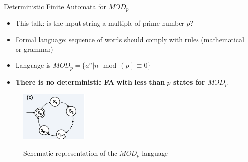 \documentclass[aspectratio=169,9pt]{beamer}
\begin{document}
\begin{frame}[t]{Deterministic Finite Automata for $MOD_p$}
  \begin{itemize}
    \item This talk: is the input string a multiple of prime number $p$?
    \item Formal language: sequence of words should comply with rules (mathematical or grammar)
    \item Language is $MOD_p=\{a^n|n \mod(p)\equiv 0\}$  
    \item \textbf{There is no deterministic FA with less than $p$ states for $MOD_p$}
  \end{itemize}
  \vspace*{2em}
  \begin{figure}
    \centering
      \includegraphics[width=0.3\textwidth]{QFA_MODn.png}\\
      \caption*{Schematic representation of the $MOD_p$ language}
  \end{figure}
\end{frame}
\end{document}
